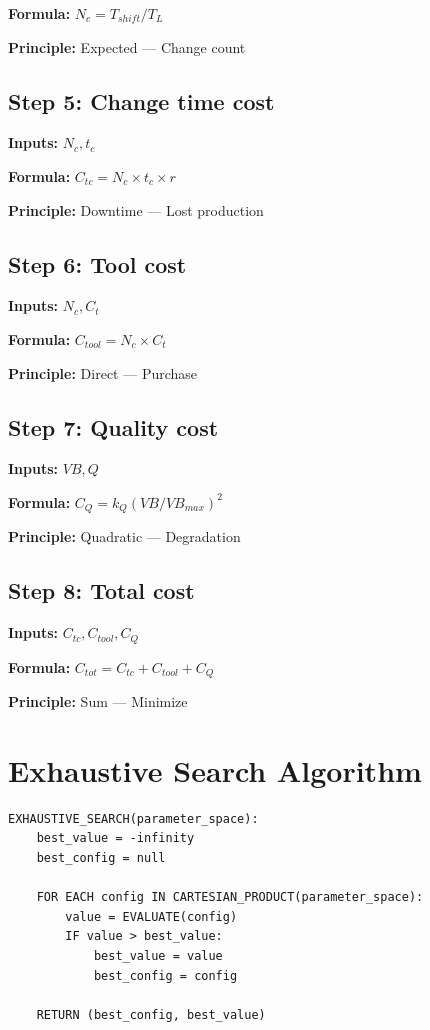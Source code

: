\documentclass[11pt,twocolumn]{article}
\begin{document}
\textbf{Formula:} $N_c = T_{shift}/T_L$

\textbf{Principle:} Expected --- Change count

\subsection*{Step 5: Change time cost}
\textbf{Inputs:} $N_c, t_c$

\textbf{Formula:} $C_{tc} = N_c \times t_c \times r$

\textbf{Principle:} Downtime --- Lost production

\subsection*{Step 6: Tool cost}
\textbf{Inputs:} $N_c, C_t$

\textbf{Formula:} $C_{tool} = N_c \times C_t$

\textbf{Principle:} Direct --- Purchase

\subsection*{Step 7: Quality cost}
\textbf{Inputs:} $VB, Q$

\textbf{Formula:} $C_Q = k_Q (VB/VB_{max})^2$

\textbf{Principle:} Quadratic --- Degradation

\subsection*{Step 8: Total cost}
\textbf{Inputs:} $C_{tc}, C_{tool}, C_Q$

\textbf{Formula:} $C_{tot} = C_{tc} + C_{tool} + C_Q$

\textbf{Principle:} Sum --- Minimize


\section{Exhaustive Search Algorithm}

\begin{verbatim}
EXHAUSTIVE_SEARCH(parameter_space):
    best_value = -infinity
    best_config = null
    
    FOR EACH config IN CARTESIAN_PRODUCT(parameter_space):
        value = EVALUATE(config)
        IF value > best_value:
            best_value = value
            best_config = config
    
    RETURN (best_config, best_value)
\end{verbatim}
\end{document}
